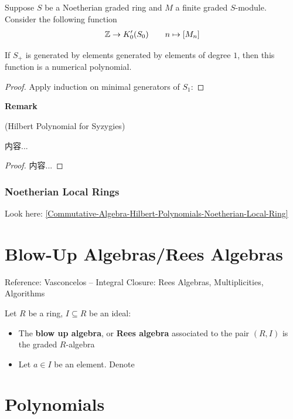 \documentclass[Total.tex]{subfiles}
\begin{document}
				\begin{proposition}
					Suppose $S$ be a Noetherian graded ring and $M$ a finite graded $S$-module. Consider the following function
					\begin{gather*}
						\mathbb{Z}\rightarrow K_0'(S_0)\qquad n\mapsto [M_n]
					\end{gather*}
					
					If $S_+$ is generated by elements generated by elements of degree $1$, then this function is a numerical polynomial.
				\end{proposition}
				\begin{proof}
					Apply induction on minimal generators of $S_1$:
				\end{proof}
				
				\textbf{Remark}
				\begin{example}
					(Hilbert Polynomial for Syzygies)
				\end{example}
				
				\begin{lemma}
					内容...
				\end{lemma}
				\begin{proof}
					内容...
				\end{proof}
				\subsection{Noetherian Local Rings}
				
				Look here: \ref{Commutative-Algebra-Hilbert-Polynomials-Noetherian-Local-Ring}
	\chapter{Blow-Up Algebras/Rees Algebras}
		
		Reference: Vasconcelos – Integral Closure: Rees Algebras, Multiplicities, Algorithms
		
		\begin{Def}
			Let $R$ be a ring, $I\subseteq R$ be an ideal:
			
			\begin{itemize}
				\item The \textbf{blow up algebra}, or \textbf{Rees algebra} associated to the pair $(R,I)$ is the graded $R$-algebra
				\item Let $a\in I$ be an element. Denote
			\end{itemize}
		\end{Def}
		
	\chapter{Polynomials}
		
\end{document}
